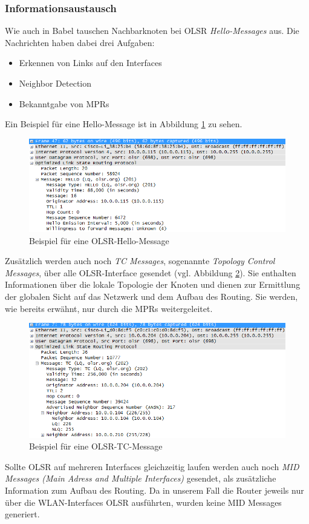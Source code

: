 \documentclass[10pt]{scrartcl}
\begin{document}
\subsubsection{Informationsaustausch}
Wie auch in Babel tauschen Nachbarknoten bei OLSR \textit{Hello-Messages} aus.
Die Nachrichten haben dabei drei Aufgaben:
\begin{itemize}
	\item Erkennen von Links auf den Interfaces
	\item Neighbor Detection
	\item Bekanntgabe von MPRs
\end{itemize}
Ein Beispiel für eine Hello-Message ist in Abbildung \ref{fig:OlsrHelloMessage} zu sehen.
\begin{figure}[htbp]
	\centering	\includegraphics[width = 1.0\textwidth]{Grafiken/olsr_hello_message_example.png}
	\caption{Beispiel für eine OLSR-Hello-Message}
	\label{fig:OlsrHelloMessage}
\end{figure}
Zusätzlich werden auch noch \textit{TC Messages}, sogenannte \textit{Topology Control Messages}, über alle OLSR-Interface gesendet (vgl. Abbildung \ref{fig:TcMessage}).
Sie enthalten Informationen über die lokale Topologie der Knoten und dienen zur Ermittlung der globalen Sicht auf das Netzwerk und dem Aufbau des Routing.
Sie werden, wie bereits erwähnt, nur durch die MPRs weitergeleitet.\\
\begin{figure}[htbp]
	\centering	\includegraphics[width = 1.0\textwidth]{Grafiken/olsr_tc_message_example.png}
	\caption{Beispiel für eine OLSR-TC-Message}
	\label{fig:TcMessage}
\end{figure}
Sollte OLSR auf mehreren Interfaces gleichzeitig laufen werden auch noch \textit{MID Messages (Main Adress and Multiple Interfaces)} gesendet, als zusätzliche Information zum Aufbau des Routing.
Da in unserem Fall die Router jeweils nur über die WLAN-Interfaces OLSR ausführten, wurden keine MID Messages generiert.\\
\end{document}
